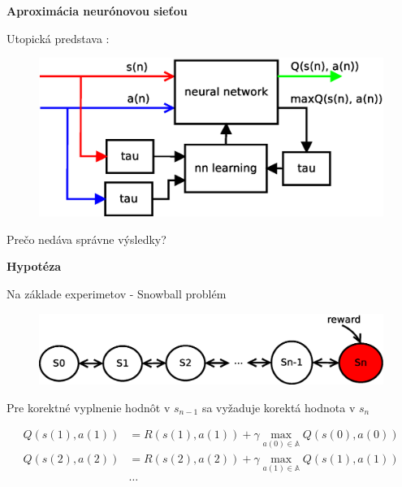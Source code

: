 \documentclass[xcolor=dvipsnames]{beamer}
\begin{document}
\begin{frame}{\bf Aproximácia neurónovou sieťou}

Utopická predstava :

\begin{figure}[!htb]
\includegraphics[scale=.5]{../diagrams/q_learning_nn.eps}
\end{figure}

Prečo nedáva správne výsledky?
\end{frame}


\begin{frame}{\bf Hypotéza}

Na základe experimetov - Snowball problém

\begin{figure}[!htb]
\includegraphics[scale=.5]{../diagrams/q_chain_problem.eps}
\end{figure}

Pre korektné vyplnenie hodnôt v $s_{n-1}$ sa vyžaduje korektá hodnota v $s_{n}$

\begin{align*}
    Q(s(1),a(1)) &= R(s(1),a(1)) + \gamma \max_{a(0) \in \mathbb{A}} Q(s(0), a(0)) \\
    Q(s(2),a(2)) &= R(s(2),a(2)) + \gamma \max_{a(1) \in \mathbb{A}} Q(s(1), a(1)) \\
    & \dots
\end{align*}

\end{frame}
\end{document}
